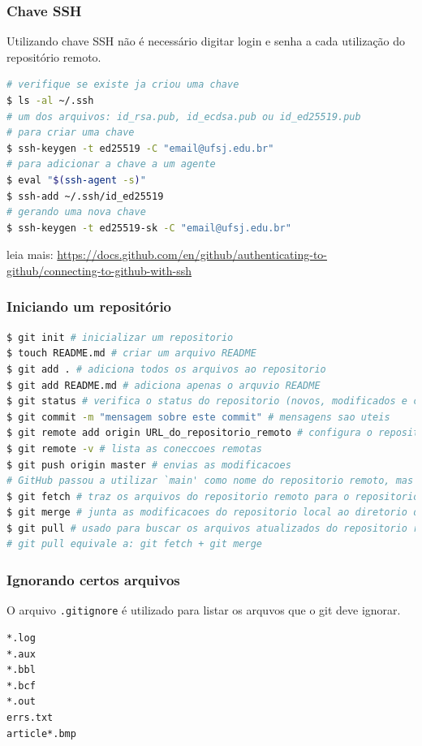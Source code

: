 \begin{frame}[fragile]
\frametitle{Chave SSH}
Utilizando chave SSH não é necessário digitar login e senha a cada utilização do repositório remoto.
\begin{lstlisting}[language=bash, label=lst-git-ssh, caption={Utilização de chave SSH.}, postbreak=\mbox{$\hookrightarrow$\space}, basicstyle=\fontsize{8}{10}\selectfont\ttfamily]
# verifique se existe ja criou uma chave
$ ls -al ~/.ssh
# um dos arquivos: id_rsa.pub, id_ecdsa.pub ou id_ed25519.pub
# para criar uma chave
$ ssh-keygen -t ed25519 -C "email@ufsj.edu.br"
# para adicionar a chave a um agente
$ eval "$(ssh-agent -s)"
$ ssh-add ~/.ssh/id_ed25519
# gerando uma nova chave
$ ssh-keygen -t ed25519-sk -C "email@ufsj.edu.br"
\end{lstlisting}

leia mais:
\url{https://docs.github.com/en/github/authenticating-to-github/connecting-to-github-with-ssh}
\end{frame}


\begin{frame}
\frametitle{Iniciando um repositório}
\begin{lstlisting}[language=bash, label=lst-git-init, caption={Inicializando um repositório.}, postbreak=\mbox{$\hookrightarrow$\space}, basicstyle=\fontsize{8}{10}\selectfont\ttfamily]
$ git init # inicializar um repositorio
$ touch README.md # criar um arquivo README
$ git add . # adiciona todos os arquivos ao repositorio
$ git add README.md # adiciona apenas o arquvio README
$ git status # verifica o status do repositorio (novos, modificados e commited)
$ git commit -m "mensagem sobre este commit" # mensagens sao uteis
$ git remote add origin URL_do_repositorio_remoto # configura o repositorio remoto
$ git remote -v # lista as coneccoes remotas
$ git push origin master # envias as modificacoes 
# GitHub passou a utilizar `main' como nome do repositorio remoto, mas podemos trocar
$ git fetch # traz os arquivos do repositorio remoto para o repositorio local
$ git merge # junta as modificacoes do repositorio local ao diretorio de trabalho
$ git pull # usado para buscar os arquivos atualizados do repositorio remoto
# git pull equivale a: git fetch + git merge
\end{lstlisting}
\end{frame}

\begin{frame}[fragile]
\frametitle{Ignorando certos arquivos}
O arquivo \texttt{.gitignore} é utilizado para listar os arquvos que o git deve ignorar.

\begin{lstlisting}[language=bash, label=lst-git-ignore, caption={Exemplo de arquivo \texttt{.gitignore}.}, postbreak=\mbox{$\hookrightarrow$\space}, basicstyle=\fontsize{8}{10}\selectfont\ttfamily]
*.log
*.aux
*.bbl
*.bcf
*.out
errs.txt
article*.bmp
\end{lstlisting}
\end{frame}


